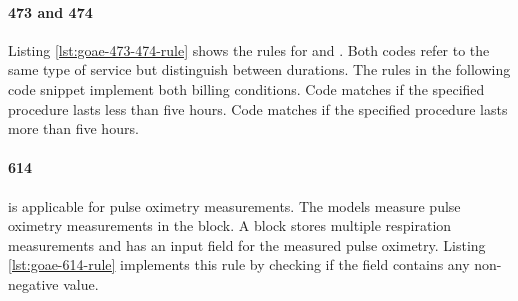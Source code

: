 \paragraph{473 and 474}
Listing \ref{lst:goae-473-474-rule} shows the rules for 
and
.
Both codes refer to the same type of service but distinguish between durations.
The rules in the following code snippet implement both billing conditions.
Code  matches if the specified procedure lasts less than five hours.
Code  matches if the specified procedure lasts more than five hours.



\paragraph{614}
 is applicable for pulse oximetry measurements.
The \AVS models measure pulse oximetry measurements in the  block.
A  block stores multiple respiration measurements and has an input field for the measured pulse oximetry.
Listing \ref{lst:goae-614-rule} implements this rule by checking if the  field contains any non-negative value.

